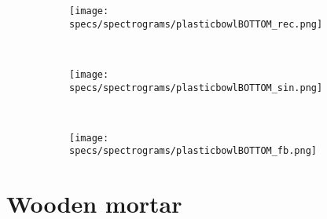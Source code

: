 \begin{figure}[H]
    \begin{subfigure}[b]{0.25\textwidth}
        \texttt{[image: specs/spectrograms/plasticbowlBOTTOM\_rec.png]}
    \end{subfigure}%
    ~ %
    \begin{subfigure}[b]{0.25\textwidth}
        \texttt{[image: specs/spectrograms/plasticbowlBOTTOM\_sin.png]}
    \end{subfigure}%
    ~ %
    \begin{subfigure}[b]{0.25\textwidth}
        \texttt{[image: specs/spectrograms/plasticbowlBOTTOM\_fb.png]}
    \end{subfigure}%
\end{figure}

\section*{Wooden mortar}


